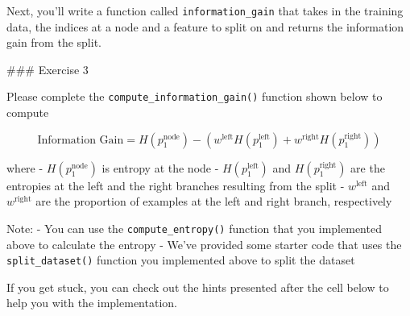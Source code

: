 \documentclass[11pt]{article}
\begin{document}
Next, you'll write a function called \texttt{information\_gain} that
takes in the training data, the indices at a node and a feature to split
on and returns the information gain from the split.

\#\#\# Exercise 3

Please complete the \texttt{compute\_information\_gain()} function shown
below to compute

\[\text{Information Gain} = H(p_1^\text{node})- (w^{\text{left}}H(p_1^\text{left}) + w^{\text{right}}H(p_1^\text{right}))\]

where - \(H(p_1^\text{node})\) is entropy at the node -
\(H(p_1^\text{left})\) and \(H(p_1^\text{right})\) are the entropies at
the left and the right branches resulting from the split -
\(w^{\text{left}}\) and \(w^{\text{right}}\) are the proportion of
examples at the left and right branch, respectively

Note: - You can use the \texttt{compute\_entropy()} function that you
implemented above to calculate the entropy - We've provided some starter
code that uses the \texttt{split\_dataset()} function you implemented
above to split the dataset

If you get stuck, you can check out the hints presented after the cell
below to help you with the implementation.
\end{document}
